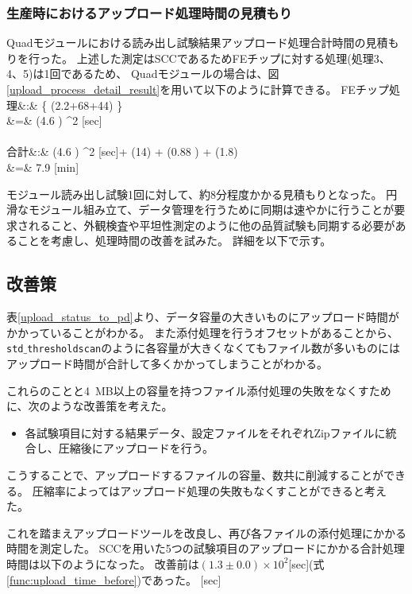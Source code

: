 \newpage
\subsubsection{生産時におけるアップロード処理時間の見積もり}
Quadモジュールにおける読み出し試験結果アップロード処理合計時間の見積もりを行った。
上述した測定はSCCであるためFEチップに対する処理(処理3、4、5)は1回であるため、
Quadモジュールの場合は、図\ref{upload_process_detail_result}を用いて以下のように計算できる。
\bbb
{\rm FE}チップ処理&:& \left\{ (2.2+68+44) \pm {}  \right\} \nonumber \\
&=& (4.6  ) ^2 [{\rm sec}]\\\nonumber\\
合計&:& (4.6  ) ^2 [\rm{sec}]+ (14) + (0.88 ) + (1.8) \nonumber \\
\label{func:upload_quad_before}
&=& 7.9  [{\rm min}]
\eee

モジュール読み出し試験1回に対して、約8分程度かかる見積もりとなった。
円滑なモジュール組み立て、データ管理を行うために同期は速やかに行うことが要求されること、外観検査や平坦性測定のように他の品質試験も同期する必要があることを考慮し、処理時間の改善を試みた。
詳細を以下で示す。

\subsection{改善策}

表\ref{upload_status_to_pd}より、データ容量の大きいものにアップロード時間がかかっていることがわかる。
また添付処理を行うオフセットがあることから、\texttt{std$\_$thresholdscan}のように各容量が大きくなくてもファイル数が多いものにはアップロード時間が合計して多くかかってしまうことがわかる。

これらのことと4~MB以上の容量を持つファイル添付処理の失敗をなくすために、次のような改善策を考えた。

\begin{itemize}
  \item 各試験項目に対する結果データ、設定ファイルをそれぞれZipファイルに統合し、圧縮後にアップロードを行う。
\end{itemize}

こうすることで、アップロードするファイルの容量、数共に削減することができる。
圧縮率によってはアップロード処理の失敗もなくすことができると考えた。

これを踏まえアップロードツールを改良し、再び各ファイルの添付処理にかかる時間を測定した。
SCCを用いた5つの試験項目のアップロードにかかる合計処理時間は以下のようになった。
改善前は$(1.3\pm 0.0)\times 10^2$[sec](式\ref{func:upload_time_before})であった。
  [{\rm sec}]
\eee

